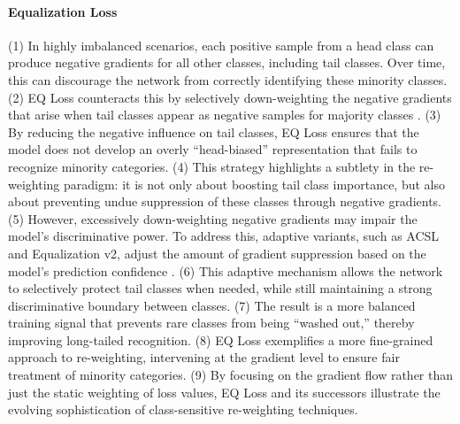 \paragraph{Equalization Loss}
(1) In highly imbalanced scenarios, each positive sample from a head class can produce negative gradients for all other classes, including tail classes. Over time, this can discourage the network from correctly identifying these minority classes.
(2) EQ Loss counteracts this by selectively down-weighting the negative gradients that arise when tail classes appear as negative samples for majority classes \cite{zhang2023deep}.
(3) By reducing the negative influence on tail classes, EQ Loss ensures that the model does not develop an overly “head-biased” representation that fails to recognize minority categories.
(4) This strategy highlights a subtlety in the re-weighting paradigm: it is not only about boosting tail class importance, but also about preventing undue suppression of these classes through negative gradients.
(5) However, excessively down-weighting negative gradients may impair the model’s discriminative power. To address this, adaptive variants, such as ACSL and Equalization v2, adjust the amount of gradient suppression based on the model’s prediction confidence \cite{tan2020equalizationlosslongtailedobject, zhang2023deep}.
(6) This adaptive mechanism allows the network to selectively protect tail classes when needed, while still maintaining a strong discriminative boundary between classes.
(7) The result is a more balanced training signal that prevents rare classes from being “washed out,” thereby improving long-tailed recognition.
(8) EQ Loss exemplifies a more fine-grained approach to re-weighting, intervening at the gradient level to ensure fair treatment of minority categories.
(9) By focusing on the gradient flow rather than just the static weighting of loss values, EQ Loss and its successors illustrate the evolving sophistication of class-sensitive re-weighting techniques.

